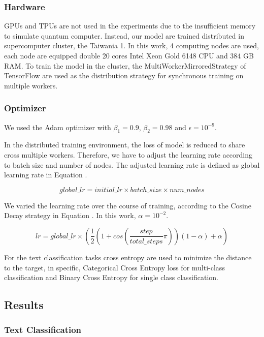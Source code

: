 \subsubsection{Hardware}

GPUs and TPUs are not used in the experiments due to the insufficient memory to simulate quantum computer. Instead, our model are trained distributed in supercomputer cluster, the Taiwania 1. In this work, 4 computing nodes are used, each node are equipped double 20 cores Intel Xeon Gold 6148 CPU and 384 GB RAM. To train the model in the cluster, the MultiWorkerMirroredStrategy of TensorFlow are used as the distribution strategy for synchronous training on multiple workers.

\subsubsection{Optimizer}

We used the Adam optimizer with $\beta_1 = 0.9$, $\beta_2 = 0.98$ and $\epsilon = 10^{-9}$.

In the distributed training environment, the loss of model is reduced to share cross multiple workers. Therefore, we have to adjust the learning rate according to batch size and number of nodes. The adjusted learning rate is defined as global learning rate in Equation \cite{equ:global_lr}.

\begin{equation} \label{equ:global_lr}
global\_lr = initial\_lr \times batch\_size \times num\_nodes
\end{equation}

We varied the learning rate over the course of training, according to the Cosine Decay strategy in Equation \cite{equ:lr}. In this work, $\alpha = 10^{-2}$.

\begin{equation} \label{equ:lr}
lr = global\_lr \times ( \frac{1}{2} (1 + cos( \frac{step}{total\_steps}\pi))(1 - \alpha) + \alpha)
\end{equation}

For the text classification tasks cross entropy are used to minimize the distance to the target, in specific, Categorical Cross Entropy loss for multi-class classification and Binary Cross Entropy for single class classification.

\subsection{Results}
\subsubsection{Text Classification}
